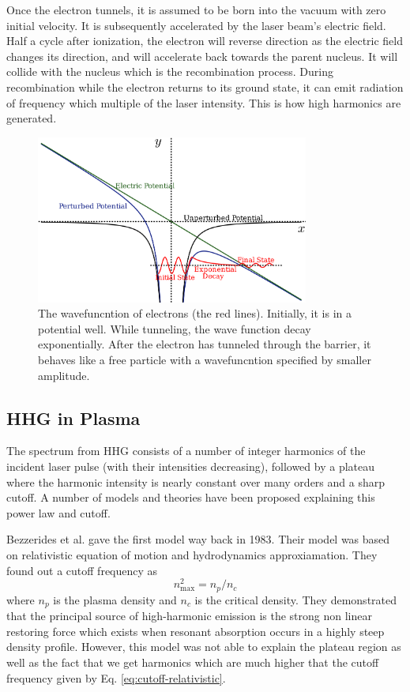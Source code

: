 \documentclass[12pt]{article}
\begin{document}
Once the electron tunnels, it is assumed to be born into the vacuum with zero initial velocity. It is subsequently accelerated by the laser beam's electric field. Half a cycle after ionization, the electron will reverse direction as the electric field changes its direction, and will accelerate back towards the parent nucleus. It will collide with the nucleus which is the recombination process. During recombination while the electron returns to its ground state, it can emit radiation of frequency which multiple of the laser intensity. This is how high harmonics are generated.

\begin{figure}[h]
    \centering
    \includegraphics[width=0.8\textwidth]{images/three_step_two.png}
    \caption{The wavefuncntion of electrons (the red lines). Initially, it is in a potential well. While tunneling, the wave function decay exponentially. After the electron has tunneled through the barrier, it behaves like a free particle with a wavefuncntion specified by smaller amplitude.}
    \label{fig:3-step-2}
\end{figure}

\subsection{HHG in Plasma}
The spectrum from HHG consists of a number of integer harmonics of the incident laser pulse (with their intensities decreasing), followed by a plateau where the harmonic intensity is nearly constant over many orders and a sharp cutoff. A number of models and theories have been proposed explaining this power law and cutoff.

Bezzerides et al.\cite{hhg-relativistic} gave the first model way back in 1983. Their model was based on relativistic equation of motion and hydrodynamics approxiamation. They found out a cutoff frequency as
\begin{equation}
    \label{eq:cutoff-relativistic}
    n_{\max}^2 = n_p/n_c
\end{equation}
where $n_p$ is the plasma density and $n_c$ is the critical density. They demonstrated that the principal source of high-harmonic emission is the strong non linear restoring force which exists when resonant absorption occurs in a highly steep density profile. However, this model was not able to explain the plateau region as well as the fact that we get harmonics which are much higher that the cutoff frequency given by Eq. \ref{eq:cutoff-relativistic}.
\end{document}
